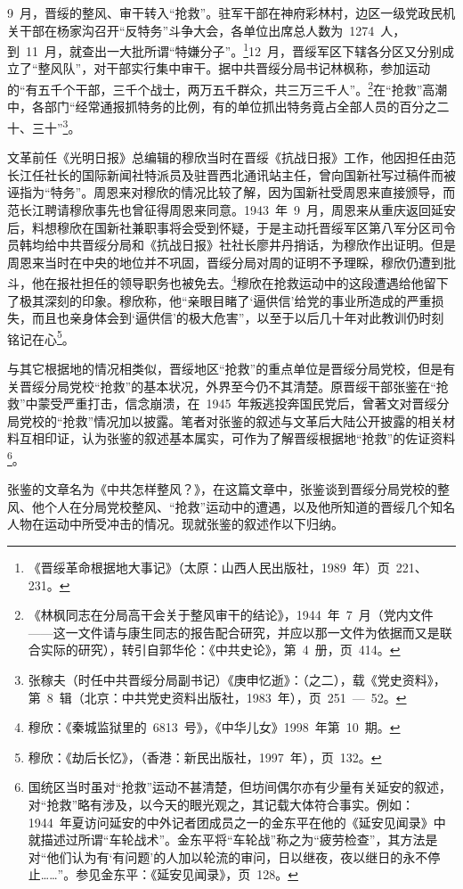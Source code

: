9~月，晋绥的整风、审干转入“抢救”。驻军干部在神府彩林村，边区一级党政民机关干部在杨家沟召开“反特务”斗争大会，各单位出席总人数为~1274~人，到~11~月，就查出一大批所谓“特嫌分子”。\footnote{《晋绥革命根据地大事记》（太原：山西人民出版社，1989~年）页~221、231。}12~月，晋绥军区下辖各分区又分别成立了“整风队”，对干部实行集中审干。据中共晋绥分局书记林枫称，参加运动的“有五千个干部，三千个战士，两万五千群众，共三万三千人”。\footnote{《林枫同志在分局高干会关于整风审干的结论》，1944~年~7~月（党内文件——这一文件请与康生同志的报告配合研究，并应以那一文件为依据而又是联合实际的研究），转引自郭华伦：《中共史论》，第~4~册，页~414。}在“抢救”高潮中，各部门“经常通报抓特务的比例，有的单位抓出特务竟占全部人员的百分之二十、三十”\footnote{张稼夫（时任中共晋绥分局副书记）《庚申忆逝》：（之二），载《党史资料》，第~8~辑（北京：中共党史资料出版社，1983~年），页~251~—~52。}。

文革前任《光明日报》总编辑的穆欣当时在晋绥《抗战日报》工作，他因担任由范长江任社长的国际新闻社特派员及驻晋西北通讯站主任，曾向国新社写过稿件而被诬指为“特务”。周恩来对穆欣的情况比较了解，因为国新社受周恩来直接颁导，而范长江聘请穆欣事先也曾征得周恩来同意。1943~年~9~月，周恩来从重庆返回延安后，料想穆欣在国新社兼职事将会受到怀疑，于是主动托晋绥军区第八军分区司令员韩均给中共晋绥分局和《抗战日报》社社长廖井丹捎话，为穆欣作出证明。但是周恩来当时在中央的地位并不巩固，晋绥分局对周的证明不予理睬，穆欣仍遭到批斗，他在报社担任的领导职务也被免去。\footnote{穆欣：《秦城监狱里的~6813~号》，《中华儿女》1998~年第~10~期。}穆欣在抢救运动中的这段遭遇给他留下了极其深刻的印象。穆欣称，他“亲眼目睹了‘逼供信’给党的事业所造成的严重损失，而且也亲身体会到‘逼供信’的极大危害”，以至于以后几十年对此教训仍时刻铭记在心\footnote{穆欣：《劫后长忆》，（香港：新民出版社，1997~年），页~132。}。

与其它根据地的情况相类似，晋绥地区“抢救”的重点单位是晋绥分局党校，但是有关晋绥分局党校“抢救”的基本状况，外界至今仍不其清楚。原晋绥干部张鉴在“抢救”中蒙受严重打击，信念崩溃，在~1945~年叛逃投奔国民党后，曾著文对晋绥分局党校的“抢救”情况加以披露。笔者对张鉴的叙述与文革后大陆公开披露的相关材料互相印证，认为张鉴的叙述基本属实，可作为了解晋绥根据地“抢救”的佐证资料\footnote{国统区当时虽对“抢救”运动不甚清楚，但坊间偶尔亦有少量有关延安的叙述，对“抢救”略有涉及，以今天的眼光观之，其记载大体符合事实。例如：1944~年夏访问延安的中外记者团成员之一的金东平在他的《延安见闻录》中就描述过所谓“车轮战术”。金东平将“车轮战”称之为“疲劳检查”，其方法是对“他们认为有‘有问题’的人加以轮流的审问，日以继夜，夜以继日的永不停止……”。参见金东平：《延安见闻录》，页~128。}。

张鉴的文章名为《中共怎样整风？》，在这篇文章中，张鉴谈到晋绥分局党校的整风、他个人在分局党校整风、“抢救”运动中的遭遇，以及他所知道的晋绥几个知名人物在运动中所受冲击的情况。现就张鉴的叙述作以下归纳。

